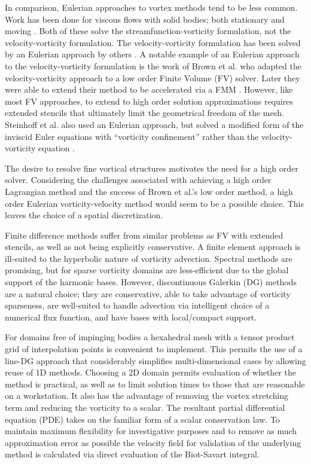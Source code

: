 \documentclass[]{aiaa-tc}%
\begin{document}
In comparison, Eulerian approaches to vortex methods tend to be less common. Work has been done for viscous flows with solid bodies; both stationary \cite{MiscMeth3} and moving \cite{MiscMeth2}. Both of these solve the streamfunction-vorticity formulation, not the velocity-vorticity formulation. The velocity-vorticity formulation has been solved by an Eulerian approach by others \cite{MiscMeth4}. A notable example of an Eulerian approach to the velocity-vorticity formulation is the work of Brown et al. \cite{Brown2000} who adapted the velocity-vorticity approach to a low order Finite Volume (FV) solver. Later they were able to extend their method to be accelerated via a FMM \cite{Brown2004}. However, like most FV approaches, to extend to high order solution approximations requires extended stencils that ultimately limit the geometrical freedom of the mesh. Steinhoff et al. also used an Eulerian approach, but solved a modified form of the inviscid Euler equations with ``vorticity confinement'' rather than the velocity-vorticity equation \cite{SteinhoffUnderhill1994}.

The desire to resolve fine vortical structures motivates the need for a high order solver. Considering the challenges associated with achieving a high order Lagrangian method and the success of Brown et al.'s low order method, a high order Eulerian vorticity-velocity method would seem to be a possible choice. This leaves the choice of a spatial discretization.

Finite difference methods suffer from similar problems as FV with extended stencils, as well as not being explicitly conservative. A finite element approach is ill-suited to the hyperbolic nature of vorticity advection. Spectral methods are promising, but for sparse vorticity domains are less-efficient due to the global support of the harmonic bases. However, discontinuous Galerkin (DG) methods \cite{HestWar} are a natural choice; they are conservative, able to take advantage of vorticity sparseness, are well-suited to handle advection via intelligent choice of a numerical flux function, and have bases with local/compact support.

For domains free of impinging bodies a hexahedral mesh with a tensor product grid of interpolation points is convenient to implement. This permits the use of a line-DG \cite{Persson2013} approach that considerably simplifies multi-dimensional cases by allowing reuse of 1D methods. Choosing a 2D domain permits evaluation of whether the method is practical, as well as to limit solution times to those that are reasonable on a workstation. It also has the advantage of removing the vortex stretching term and reducing the vorticity to a scalar. The resultant partial differential equation (PDE) takes on the familiar form of a scalar conservation law. To maintain maximum flexibility for investigative purposes and to remove as much approximation error as possible the velocity field for validation of the underlying method is calculated via direct evaluation of the Biot-Savart integral.
\end{document}
